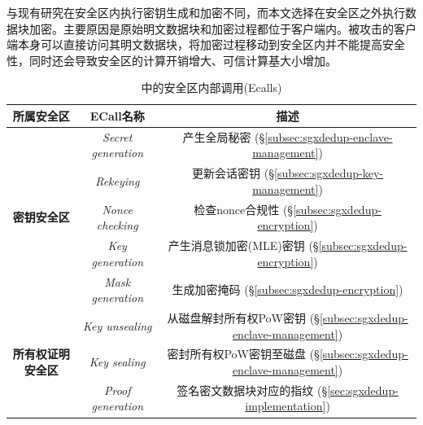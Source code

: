与现有研究\cite{kim2019ShieldStore,fuhry2020segshare,djoko2019NEXUS}在安全区内执行密钥生成和加密不同，而本文选择在安全区之外执行数据块加密。主要原因是原始明文数据块和加密过程都位于客户端内。被攻击的客户端本身可以直接访问其明文数据块，将加密过程移动到安全区内并不能提高安全性，同时还会导致安全区的计算开销增大、可信计算基大小增加。

\begin{table}[!htb]
    \small
    \centering
    \begin{tabular}{ccc}
        \toprule
        {\bf 所属安全区} & {\bf ECall名称}             & {\bf 描述}                                                           \\ 
        \midrule
        \multirow{5}{*}{\bf 密钥安全区}
                         & \textit{ Secret generation} & 产生全局秘密 
        (\S\ref{subsec:sgxdedup-enclave-management})                                                                          \\
                         & \textit{ Rekeying}          & 更新会话密钥 
        (\S\ref{subsec:sgxdedup-key-management})                                                                              \\
                         & \textit{ Nonce checking}    & 检查nonce合规性 
        (\S\ref{subsec:sgxdedup-encryption})                                                                                  \\
                         & \textit{ Key generation}    & 产生消息锁加密(MLE)密钥 (\S\ref{subsec:sgxdedup-encryption})         \\
                         & \textit{ Mask generation}   & 生成加密掩码 (\S\ref{subsec:sgxdedup-encryption})                    \\
        \hline
        \multirow{3}{*}{\bf 所有权证明安全区}
                         & \textit{ Key unsealing}     & 从磁盘解封所有权PoW密钥 (\S\ref{subsec:sgxdedup-enclave-management}) \\
                         & \textit{ Key sealing}       & 密封所有权PoW密钥至磁盘 (\S\ref{subsec:sgxdedup-enclave-management}) \\
                         & \textit{ Proof generation}  & 签名密文数据块对应的指纹 
        (\S\ref{sec:sgxdedup-implementation})                                                                                 \\
        \bottomrule
    \end{tabular}
    \caption{\sysnameS 中的安全区内部调用(Ecalls)}
    \label{tab:sgxdedup-ecall}
\end{table}

